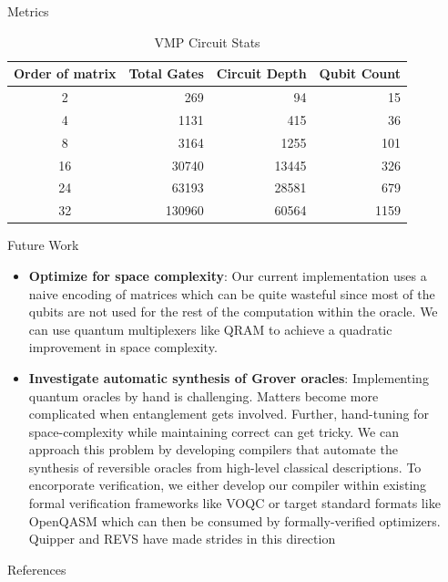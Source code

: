 \documentclass[final]{beamer}
\newlength{\sepwidth}
\newlength{\colwidth}
\newcommand{\separatorcolumn}{\begin{column}{\sepwidth}\end{column}}
\begin{document}
\begin{frame}[t]
\begin{columns}[t]
\begin{column}{\colwidth}
\begin{block}{Metrics}
    \begin{table}[t]
      \centering
      \begin{tabular}{c r r r}
        \toprule
        \textbf{Order of matrix} & \textbf{Total Gates} & \textbf{Circuit
        Depth} & \textbf{Qubit Count} \\
        \midrule
        2 & 269 & 94 & 15 \\
        4 & 1131 & 415 & 36 \\
        8 & 3164 & 1255 & 101 \\
        16 & 30740 & 13445 & 326 \\
        24 & 63193 & 28581 & 679 \\
        32 & 130960 & 60564 & 1159 \\
        \bottomrule
      \end{tabular}
      \caption{VMP Circuit Stats}
      \label{table:circuit_stats}
    \end{table}

  \end{block}

  \begin{block}{Future Work}
    \begin{itemize}
      \item \textbf{Optimize for space complexity}: Our current
        implementation uses a naive encoding of matrices which can be quite
        wasteful since most of the qubits are not used for the rest of the
        computation within the oracle. We can use quantum multiplexers like
        QRAM \cite{qram_2008} to achieve a quadratic improvement in space
        complexity.
      \item \textbf{Investigate automatic synthesis of Grover oracles}:
        Implementing quantum oracles by hand is challenging. Matters become
        more complicated when entanglement gets involved. Further,
        hand-tuning for space-complexity while maintaining correct can get
        tricky. We can approach this problem by developing compilers that
        automate the synthesis of reversible oracles from high-level
        classical descriptions. To encorporate verification, we either
        develop our compiler within existing formal verification frameworks
        like VOQC \cite{voqc_2021} or target standard formats like OpenQASM which can then be
        consumed by formally-verified optimizers. Quipper
        \cite{quipper_2013} and REVS \cite{amy2017verified} have made strides in this direction
    \end{itemize}
  \end{block}

  \begin{block}{References}

    \nocite{*}
    \footnotesize{}

  \end{block}

\end{column}

\separatorcolumn
\end{columns}
\end{frame}
\end{document}
